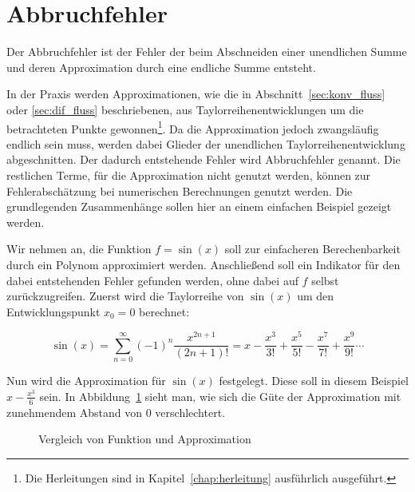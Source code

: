 \section{Abbruchfehler}

Der Abbruchfehler ist der Fehler der beim Abschneiden einer unendlichen Summe
und deren Approximation durch eine endliche Summe entsteht.

In der Praxis werden Approximationen, wie die in Abschnitt~\ref{sec:konv_fluss} oder
\ref{sec:dif_fluss} beschriebenen, aus Taylorreihenentwicklungen um die betrachteten
Punkte gewonnen\footnote{Die Herleitungen sind in Kapitel~\ref{chap:herleitung} ausführlich ausgeführt.}. 
Da die Approximation jedoch zwangsläufig endlich sein muss, werden
dabei Glieder der unendlichen Taylorreihenentwicklung abgeschnitten. Der dadurch entstehende
Fehler wird Abbruchfehler genannt.
Die restlichen Terme, für die Approximation nicht genutzt werden, können zur Fehlerabschätzung
bei numerischen Berechnungen genutzt werden. Die grundlegenden Zusammenhänge sollen hier an einem einfachen Beispiel gezeigt werden.

Wir nehmen an, die Funktion $f=\sin(x)$ soll zur einfacheren Berechenbarkeit durch
ein Polynom approximiert werden. Anschließend soll ein Indikator für den dabei
entstehenden Fehler gefunden werden, ohne dabei auf $f$
selbst zurückzugreifen.
Zuerst wird die Taylorreihe von $\sin(x)$ um den Entwicklungspunkt $x_0 =0$ berechnet:

\begin{equation}
  \sin(x) = \sum_{n=0}^{\infty}(-1)^n \frac{x^{2n+1}}{(2n+1)!} = 
  x-\frac{x^3}{3!} +\frac{x^5}{5!} -\frac{x^7}{7!} +\frac{x^9}{9!}\cdots
 \label{eq:taylor_example}
\end{equation}

Nun wird die Approximation für $\sin(x)$ festgelegt. Diese soll in diesem Beispiel
$x-\frac{x^3}{6} $ sein. In Abbildung~\ref{fig:taylor_example} sieht man, wie sich die Güte der
Approximation mit zunehmendem Abstand von $0$ verschlechtert.

\begin{figure}[h]
\centering
\caption{Vergleich von Funktion und Approximation}
 \label{fig:taylor_example}
\end{figure}

